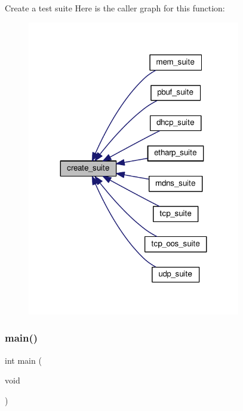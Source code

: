 Create a test suite Here is the caller graph for this function\+:
\nopagebreak
\begin{figure}[H]
\begin{center}
\leavevmode
\includegraphics[width=263pt]{openmote-cc2538_2lwip_2test_2unit_2lwip__unittests_8c_a1087412a73ffe1f50078f13baf82d55c_icgraph}
\end{center}
\end{figure}
\mbox{\label{openmote-cc2538_2lwip_2test_2unit_2lwip__unittests_8c_a840291bc02cba5474a4cb46a9b9566fe}} 
\subsubsection{\texorpdfstring{main()}{main()}}
{\footnotesize\ttfamily int main (\begin{DoxyParamCaption}\item[{void}]{ }\end{DoxyParamCaption})}

